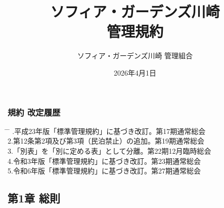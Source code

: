 \documentclass[
  twoside,
  luatex,
  paper=a4paper,
  fontsize=11pt,
  jafontsize=11pt,
  jlreq_notes,
]{jlreq}
\renewcommand{\baselinestretch}{0.9}
\begin{document}
  \pagestyle{empty} %
  \title{ソフィア・ガーデンズ川崎\\管理規約}
  \date{2026年4月1日}
  \maketitle
  \thispagestyle{empty}
  \vfill      %

  \begin{center}
    \vspace*{3\baselineskip}
    \author{\Large ソフィア・ガーデンズ川崎 管理組合}
  \end{center}
  \vspace*{2\baselineskip}
  { \renewcommand{\baselinestretch}{0.8}\selectfont   %
    \subsubsection*{ 規約 改定履歴 }
    \small
    \vspace*{1\baselineskip}
    \begin{tabbing}
      \hspace{5mm} \= \hspace{90mm} \= \hspace{100mm} .\>平成23年版「標準管理規約」に基づき改訂。\>第17期通常総会\\
      2.\>第12条第2項及び第3項（民泊禁止）の追加。\>第19期通常総会\\
      3.\>「別表」を「別に定める表」として分離。\>第22期12月臨時総会\\
      4.\>令和3年版「標準管理規約」に基づき改訂。\>第23期通常総会\\
      5.\>令和6年版「標準管理規約」に基づき改訂。\>第27期通常総会\\
    \end{tabbing}
  }
  \clearpage

  { \renewcommand{\baselinestretch}{0.8}\selectfont
    \tableofcontents        %
  }
  \cleardoublepage 

  \setcounter{page}{1}    %
  \pagestyle{plain}       %

  \begin{center}
    \subsection*{第1章 総則}
  \end{center}
\end{document}
